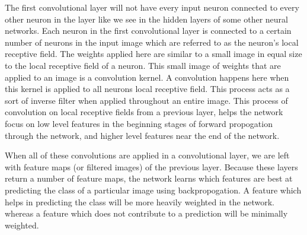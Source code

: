 \documentclass[12pt]{article} %
\begin{document}
	The first convolutional layer will not have every input neuron connected to every other neuron in the layer like we see in the hidden layers of some other neural networks. Each neuron in the first convolutional layer is connected to a certain number of neurons in the input image which are referred to as the neuron's local receptive field. The weights applied here are similar to a small image in equal size to the local receptive field of a neuron. This small image of weights that are applied to an image is a convolution kernel. A convolution happens here when this kernel is applied to all neurons local receptive field. This process acts as a sort of inverse filter when applied throughout an entire image. This process of convolution on local receptive fields from a previous layer, helps the network focus on low level features in the beginning stages of forward propogation through the network, and higher level features near the end of the network.\cite{aurelienMachineLearning} 
	
	When all of these convolutions are applied in a convolutional layer, we are left with feature maps (or filtered images) of the previous layer. Because these layers return a number of feature maps, the network learns which features are best at predicting the class of a particular image using backpropogation. A feature which helps in predicting the class will be more heavily weighted in the network. whereas a feature which does not contribute to a prediction will be minimally weighted.
	
\end{document}

